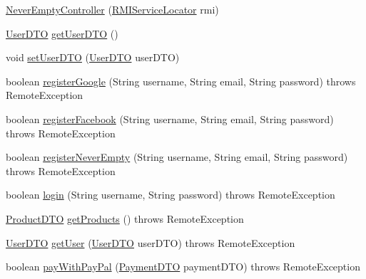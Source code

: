 \begin{DoxyCompactItemize}
\item 
\mbox{\hyperlink{class_s_p_q_1_1controller_1_1_never_empty_controller_ade8f8a56514a9ef3676a93c79b404be5}{Never\+Empty\+Controller}} (\mbox{\hyperlink{class_s_p_q_1_1remote_1_1_r_m_i_service_locator}{R\+M\+I\+Service\+Locator}} rmi)
\item 
\mbox{\hyperlink{class_s_p_q_1_1dto_1_1_user_d_t_o}{User\+D\+TO}} \mbox{\hyperlink{class_s_p_q_1_1controller_1_1_never_empty_controller_ac6b9878caf6a1f22117adf18c5ca56b5}{get\+User\+D\+TO}} ()
\item 
void \mbox{\hyperlink{class_s_p_q_1_1controller_1_1_never_empty_controller_a847c0288b7c18327d81c092f8c234d01}{set\+User\+D\+TO}} (\mbox{\hyperlink{class_s_p_q_1_1dto_1_1_user_d_t_o}{User\+D\+TO}} user\+D\+TO)
\item 
boolean \mbox{\hyperlink{class_s_p_q_1_1controller_1_1_never_empty_controller_a0adc4a1885dcc8ef6fe53bd23ee2316a}{register\+Google}} (String username, String email, String password)  throws Remote\+Exception 
\item 
boolean \mbox{\hyperlink{class_s_p_q_1_1controller_1_1_never_empty_controller_ad766d360d5d5c69d6e6d5b2953b27fac}{register\+Facebook}} (String username, String email, String password)  throws Remote\+Exception 
\item 
boolean \mbox{\hyperlink{class_s_p_q_1_1controller_1_1_never_empty_controller_ad02b010ba25f24bf105fe7b4605e3de1}{register\+Never\+Empty}} (String username, String email, String password)  throws Remote\+Exception 
\item 
boolean \mbox{\hyperlink{class_s_p_q_1_1controller_1_1_never_empty_controller_adb8f5dbbfedb5f3c231de53dccc88899}{login}} (String username, String password)  throws Remote\+Exception 
\item 
\mbox{\hyperlink{class_s_p_q_1_1dto_1_1_product_d_t_o}{Product\+D\+TO}} \mbox{\hyperlink{class_s_p_q_1_1controller_1_1_never_empty_controller_ace99d4d39979b72d620871475a4817f9}{get\+Products}} ()  throws Remote\+Exception
\item 
\mbox{\hyperlink{class_s_p_q_1_1dto_1_1_user_d_t_o}{User\+D\+TO}} \mbox{\hyperlink{class_s_p_q_1_1controller_1_1_never_empty_controller_a4f799c7fc9ce32740ec45401fa6fd1b1}{get\+User}} (\mbox{\hyperlink{class_s_p_q_1_1dto_1_1_user_d_t_o}{User\+D\+TO}} user\+D\+TO)  throws Remote\+Exception 
\item 
boolean \mbox{\hyperlink{class_s_p_q_1_1controller_1_1_never_empty_controller_aefc0dae2c43c2960719176d390f3ad9c}{pay\+With\+Pay\+Pal}} (\mbox{\hyperlink{class_s_p_q_1_1dto_1_1_payment_d_t_o}{Payment\+D\+TO}} payment\+D\+TO)  throws Remote\+Exception 

\end{DoxyCompactItemize}
